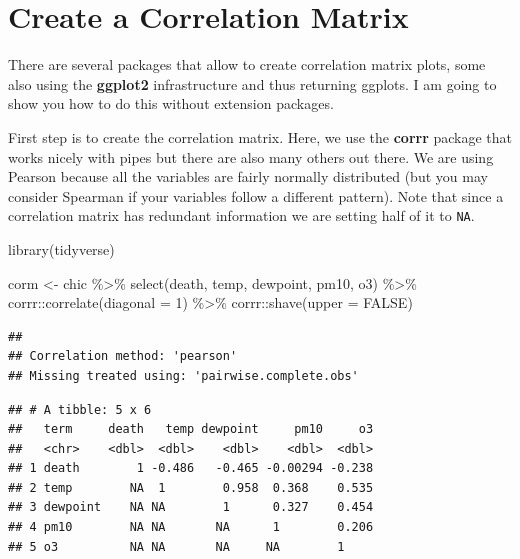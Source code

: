 \documentclass[
]{krantz}
\makeatletter
\newenvironment{Shaded}{\begin{snugshade}}{\end{snugshade}}
\newcommand{\AttributeTok}[1]{\textcolor[rgb]{0.61,0.61,0.61}{#1}}
\newcommand{\ConstantTok}[1]{\textcolor[rgb]{0,0,0}{#1}}
\newcommand{\DecValTok}[1]{\textcolor[rgb]{0.06,0.06,0.06}{#1}}
\newcommand{\FunctionTok}[1]{\textcolor[rgb]{0,0,0}{#1}}
\newcommand{\NormalTok}[1]{#1}
\newcommand{\OtherTok}[1]{\textcolor[rgb]{0.37,0.37,0.37}{#1}}
\newcommand{\SpecialCharTok}[1]{\textcolor[rgb]{0,0,0}{#1}}
\newenvironment{kframe}{%
\medskip{}
\setlength{\fboxsep}{.8em}
 \def\at@end@of@kframe{}%
 \ifinner\ifhmode%
  \def\at@end@of@kframe{\end{minipage}}%
  \begin{minipage}{\columnwidth}%
 \fi\fi%
 \def\FrameCommand##1{\hskip\@totalleftmargin \hskip-\fboxsep
 \colorbox{shadecolor}{##1}\hskip-\fboxsep
     \hskip-\linewidth \hskip-\@totalleftmargin \hskip\columnwidth}%
 \MakeFramed {\advance\hsize-\width
   \@totalleftmargin\z@ \linewidth\hsize
   \@setminipage}}%
 {\par\unskip\endMakeFramed%
 \at@end@of@kframe}
\renewenvironment{Shaded}{\begin{kframe}}{\end{kframe}}
\makeatother
\begin{document}
\hypertarget{create-a-correlation-matrix}{%
\section{Create a Correlation Matrix}\label{create-a-correlation-matrix}}

There are several packages that allow to create correlation matrix plots, some also using the \textbf{ggplot2} infrastructure and thus returning ggplots. I am going to show you how to do this without extension packages.

First step is to create the correlation matrix. Here, we use the \textbf{corrr} package that works nicely with pipes but there are also many others out there. We are using Pearson because all the variables are fairly normally distributed (but you may consider Spearman if your variables follow a different pattern). Note that since a correlation matrix has redundant information we are setting half of it to \texttt{NA}.

\begin{Shaded}
\begin{Highlighting}[]
\FunctionTok{library}\NormalTok{(tidyverse)}

\NormalTok{corm }\OtherTok{\textless{}{-}}
\NormalTok{  chic }\SpecialCharTok{\%\textgreater{}\%}
  \FunctionTok{select}\NormalTok{(death, temp, dewpoint, pm10, o3) }\SpecialCharTok{\%\textgreater{}\%}
\NormalTok{  corrr}\SpecialCharTok{::}\FunctionTok{correlate}\NormalTok{(}\AttributeTok{diagonal =} \DecValTok{1}\NormalTok{) }\SpecialCharTok{\%\textgreater{}\%}
\NormalTok{  corrr}\SpecialCharTok{::}\FunctionTok{shave}\NormalTok{(}\AttributeTok{upper =} \ConstantTok{FALSE}\NormalTok{)}
\end{Highlighting}
\end{Shaded}

\begin{verbatim}
## 
## Correlation method: 'pearson'
## Missing treated using: 'pairwise.complete.obs'
\end{verbatim}

\begin{verbatim}
## # A tibble: 5 x 6
##   term     death   temp dewpoint     pm10     o3
##   <chr>    <dbl>  <dbl>    <dbl>    <dbl>  <dbl>
## 1 death        1 -0.486   -0.465 -0.00294 -0.238
## 2 temp        NA  1        0.958  0.368    0.535
## 3 dewpoint    NA NA        1      0.327    0.454
## 4 pm10        NA NA       NA      1        0.206
## 5 o3          NA NA       NA     NA        1
\end{verbatim}
\end{document}
